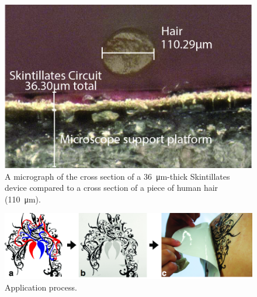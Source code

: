 \documentclass{sigchi}
\begin{document}

\begin{figure}[!h]
\centering
\includegraphics[width=1\columnwidth]{figures/Figure2}
\caption{A micrograph of the cross section of a \SI{36}{\micro\metre}-thick Skintillates device compared to a cross section of a piece of human
hair (\SI{110}{\micro\metre}).}
\vspace{-8pt}
\label{fig:micrograph}
\end{figure}
\begin{figure} [!ht]
\centering
\includegraphics[width=1.0\textwidth]{figures/Figure3}
\caption{Application process.}
\vspace{-8pt}
\label{fig:applicationprocess}
\end{figure}
\end{document}
